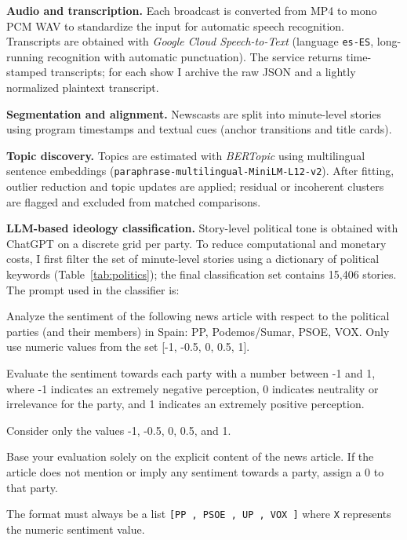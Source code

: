 \documentclass[12pt]{article}
\begin{document}
\textbf{Audio and transcription.} Each broadcast is converted from MP4 to mono PCM WAV to standardize the input for automatic speech recognition. Transcripts are obtained with \emph{Google Cloud Speech-to-Text} (language \texttt{es-ES}, long-running recognition with automatic punctuation). The service returns time-stamped transcripts; for each show I archive the raw JSON and a lightly normalized plaintext transcript.

\textbf{Segmentation and alignment.} Newscasts are split into minute-level stories using program timestamps and textual cues (anchor transitions and title cards). 

\textbf{Topic discovery.} Topics are estimated with \emph{BERTopic} using multilingual sentence embeddings (\texttt{paraphrase-multilingual-MiniLM-L12-v2}). After fitting, outlier reduction and topic updates are applied; residual or incoherent clusters are flagged and excluded from matched comparisons.

\textbf{LLM-based ideology classification.} Story-level political tone is obtained with ChatGPT on a discrete grid per party. To reduce computational and monetary costs, I first filter the set of minute-level stories using a dictionary of political keywords (Table~\ref{tab:politics}); the final classification set contains 15{,}406 stories. The prompt used in the classifier is:

\begin{tcolorbox}[colback=blue!5!white, colframe=blue!75!black, title=Prompt]
	Analyze the sentiment of the following news article with respect to the political parties (and their members) in Spain: PP, Podemos/Sumar, PSOE, VOX. Only use numeric values from the set [-1, -0.5, 0, 0.5, 1].
	
	Evaluate the sentiment towards each party with a number between -1 and 1, where -1 indicates an extremely negative perception, 0 indicates neutrality or irrelevance for the party, and 1 indicates an extremely positive perception.
	
	Consider only the values -1, -0.5, 0, 0.5, and 1.
	
	Base your evaluation solely on the explicit content of the news article. If the article does not mention or imply any sentiment towards a party, assign a 0 to that party.
	
	The format must always be a list \texttt{[PP
		, PSOE
		, UP
		, VOX
		]} where \texttt{X} represents the numeric sentiment value.
\end{tcolorbox}
\end{document}
